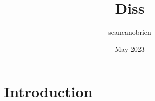 \documentclass{article}
\title{Diss}
\author{seancanobrien }
\date{May 2023}
\begin{document}
\maketitle

\section{Introduction}
\end{document}
